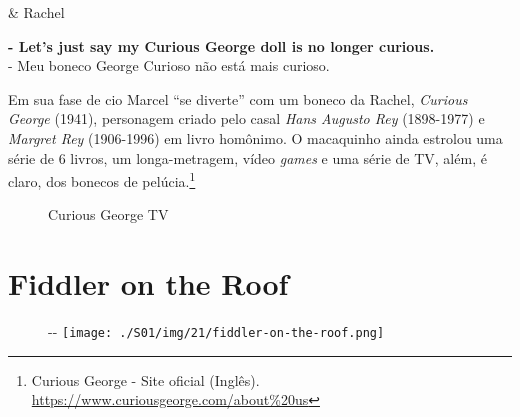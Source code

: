 \begin{tcolorbox}[enhanced,center upper,
    drop fuzzy shadow southeast, boxrule=0.3pt,
    lower separated=false, breakable,
    colframe=black!30!dialogoBorder,colback=white]
\medskip
\begin{minipage}[c]{0.16\linewidth}
   & \centering \scriptsize{Rachel}
\end{minipage}
\hfill
\begin{minipage}[c]{0.8\linewidth}
  \textbf{- Let's just say my Curious George doll is no longer curious.}\\
  - Meu boneco George Curioso não está mais curioso.
\end{minipage}
\end{tcolorbox}

Em sua fase de cio Marcel ``se diverte'' com um boneco da Rachel,
\emph{Curious George} (1941), personagem criado pelo casal \emph{Hans
Augusto Rey} (1898-1977) e \emph{Margret Rey} (1906-1996) em livro
homônimo. O macaquinho ainda estrolou uma série de 6 livros, um
longa-metragem, vídeo \emph{games} e uma série de TV, além, é claro, dos
bonecos de pelúcia.\footnote{\sloppy Curious George - Site oficial (Inglês). \url{https://www.curiousgeorge.com/about\%20us}}

\begin{figure}
  \centering
    \caption{Curious George TV\label{fig:curious-george-tv}}
\end{figure}

\hypertarget{fiddler-on-the-roof}{%
\section{Fiddler on the Roof}\label{fiddler-on-the-roof}}

\begin{figure}[!ht]
  \begin{adjustwidth}{-\oddsidemargin-1in}{-\rightmargin}
    \centering
    \texttt{[image: ./S01/img/21/fiddler-on-the-roof.png]}
  \end{adjustwidth}
\end{figure}

